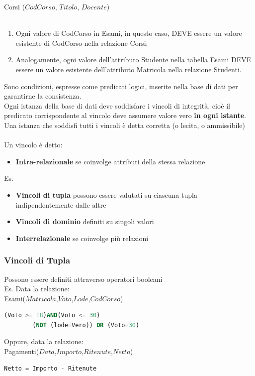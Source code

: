 \documentclass[../main.tex]{subfiles}
\begin{document}
	Corsi ($CodCorso$, $Titolo$, $Docente$) \\ \\
	\begin{enumerate}
		\item Ogni valore di CodCorso in Esami, in questo caso, DEVE essere un valore esistente di CodCorso nella relazione Corsi;
		\item Analogamente, ogni valore dell’attributo Studente nella tabella Esami DEVE essere un valore esistente dell’attributo Matricola nella relazione Studenti.
	\end{enumerate}
	Sono condizioni, espresse come predicati logici, inserite nella base di dati per garantirne la consistenza.\\
	Ogni istanza della base di dati deve soddisfare i vincoli di integrità, cioè il predicato corrispondente al vincolo deve assumere valore vero \textbf{in ogni istante}.\\
	Una istanza che soddisfi tutti i vincoli è detta corretta (o lecita, o ammissibile)\\ \\
	Un vincolo è detto:
	\begin{itemize}
		\item \textbf{Intra-relazionale} se coinvolge attributi della stessa relazione
	\end{itemize}
	Es.
	\begin{itemize}
		\item \textbf{Vincoli di tupla} possono essere valutati su ciascuna tupla indipendentemente dalle altre
		\item \textbf{Vincoli di dominio} definiti su singoli valori
		\item \textbf{Interrelazionale} se coinvolge più relazioni
	\end{itemize}
	\subsubsection{Vincoli di Tupla}
	Possono essere definiti attraverso operatori booleani\\
	Es. Data la relazione:\\
	Esami($Matricola$,$Voto$,$Lode$,$CodCorso$)
	\begin{lstlisting}[language=SQL]
		(Voto >= 18)AND(Voto <= 30) 
		(NOT (lode=Vero)) OR (Voto=30)
	\end{lstlisting}
	Oppure, data la relazione:\\
	Pagamenti($Data$,$Importo$,$Ritenute$,$Netto$)
	\begin{lstlisting}[language=SQL]
		Netto = Importo - Ritenute
	\end{lstlisting}
\end{document}
